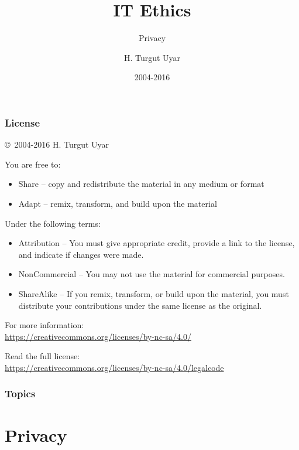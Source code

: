 \documentclass[dvipsnames]{beamer}
\title{IT Ethics}
\subtitle{Privacy}
\author{H. Turgut Uyar}
\date{2004-2016}
\theoremstyle{plain}
\begin{document}
\begin{frame}
  \titlepage
\end{frame}

\begin{frame}
  \frametitle{License}

  \hfill
  \copyright~2004-2016 H. Turgut Uyar

  \vfill
  \begin{footnotesize}
    You are free to:
    \begin{itemize}
      \itemsep0em
      \item Share -- copy and redistribute the material in any medium or format
      \item Adapt -- remix, transform, and build upon the material
    \end{itemize}

    Under the following terms:
    \begin{itemize}
      \itemsep0em
      \item Attribution -- You must give appropriate credit, provide a link to
        the license, and indicate if changes were made.

      \item NonCommercial -- You may not use the material for commercial
        purposes.

      \item ShareAlike -- If you remix, transform, or build upon the material,
        you must distribute your contributions under the same license as the
        original.
    \end{itemize}
  \end{footnotesize}

  \begin{small}
    For more information:\\
    \url{https://creativecommons.org/licenses/by-nc-sa/4.0/}

    \smallskip
    Read the full license:\\
    \url{https://creativecommons.org/licenses/by-nc-sa/4.0/legalcode}
  \end{small}
\end{frame}

\begin{frame}
  \frametitle{Topics}
  \tableofcontents
\end{frame}

\section{Privacy}
\end{document}
